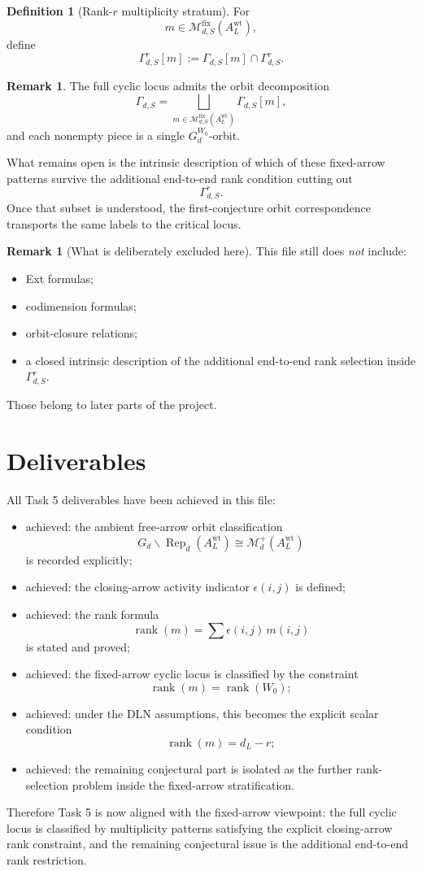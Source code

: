 \documentclass{article}
\newcommand{\rk}{\operatorname{rank}}
\newcommand{\Rep}{\operatorname{Rep}}
\theoremstyle{definition}
\newtheorem{definition}[theorem]{Definition}
\newtheorem{remark}[theorem]{Remark}
\begin{document}
\begin{definition}[Rank-$r$ multiplicity stratum]
For
\[
m\in \mathcal M_{d,S}^{\mathrm{fix}}(A_L^{\mathrm{wt}}),
\]
define
\[
\Gamma_{d,S}^r[m]
:=
\Gamma_{d,S}[m]\cap \Gamma_{d,S}^r.
\]
\end{definition}

\begin{remark}
The full cyclic locus admits the orbit decomposition
\[
\Gamma_{d,S}
=
\bigsqcup_{m\in \mathcal M_{d,S}^{\mathrm{fix}}(A_L^{\mathrm{wt}})}
\Gamma_{d,S}[m],
\]
and each nonempty piece is a single $G_d^{W_0}$-orbit.

What remains open is the intrinsic description of which of these fixed-arrow
patterns survive the additional end-to-end rank condition cutting out
\[
\Gamma_{d,S}^r.
\]
Once that subset is understood, the first-conjecture orbit correspondence
transports the same labels to the critical locus.
\end{remark}

\begin{remark}[What is deliberately excluded here]
This file still does \emph{not} include:

\begin{itemize}
\item Ext formulas;
\item codimension formulas;
\item orbit-closure relations;
\item a closed intrinsic description of the additional end-to-end rank
  selection inside $\Gamma_{d,S}^r$.
\end{itemize}

Those belong to later parts of the project.
\end{remark}

\section{Deliverables}

All Task 5 deliverables have been achieved in this file:

\begin{itemize}
\item achieved: the ambient free-arrow orbit classification
  \[
  G_d\backslash \Rep_d(A_L^{\mathrm{wt}})
  \cong
  \mathcal M_d^+(A_L^{\mathrm{wt}})
  \]
  is recorded explicitly;
\item achieved: the closing-arrow activity indicator $\epsilon(i,j)$ is defined;
\item achieved: the rank formula
  \[
  \rk(m)=\sum \epsilon(i,j)\,m(i,j)
  \]
  is stated and proved;
\item achieved: the fixed-arrow cyclic locus is classified by the constraint
  \[
  \rk(m)=\rk(W_0);
  \]
\item achieved: under the DLN assumptions, this becomes the explicit scalar
  condition
  \[
  \rk(m)=d_L-r;
  \]
\item achieved: the remaining conjectural part is isolated as the further
  rank-selection problem inside the fixed-arrow stratification.
\end{itemize}

Therefore Task 5 is now aligned with the fixed-arrow viewpoint: the full cyclic
locus is classified by multiplicity patterns satisfying the explicit
closing-arrow rank constraint, and the remaining conjectural issue is the
additional end-to-end rank restriction.
\end{document}
